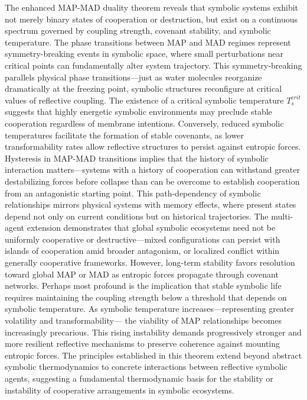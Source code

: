 \begin{scholium}
\label{scholium:bk5_Mutually Assured Continuous Progress}
The enhanced MAP-MAD duality theorem reveals that symbolic systems exhibit not merely binary states of cooperation or destruction, but exist on a continuous spectrum governed by coupling strength, covenant stability, and symbolic temperature. 
The phase transitions between MAP and MAD regimes represent symmetry-breaking events in symbolic space, where small perturbations near critical points can fundamentally alter system trajectory. This symmetry-breaking parallels physical phase transitions—just as water molecules reorganize dramatically at the freezing point, symbolic structures reconfigure at critical values of reflective coupling.
The existence of a critical symbolic temperature $T_s^{crit}$ suggests that highly energetic symbolic environments may preclude stable cooperation regardless of membrane intentions. Conversely, reduced symbolic temperatures facilitate the formation of stable covenants, as lower transformability rates allow reflective structures to persist against entropic forces.
Hysteresis in MAP-MAD transitions implies that the history of symbolic interaction matters—systems with a history of cooperation can withstand greater destabilizing forces before collapse than can be overcome to establish cooperation from an antagonistic starting point. This path-dependency of symbolic relationships mirrors physical systems with memory effects, where present states depend not only on current conditions but on historical trajectories.
The multi-agent extension demonstrates that global symbolic ecosystems need not be uniformly cooperative or destructive—mixed configurations can persist with islands of cooperation amid broader antagonism, or localized conflict within generally cooperative frameworks. However, long-term stability favors resolution toward global MAP or MAD as entropic forces propagate through covenant networks.
Perhaps most profound is the implication that stable symbolic life requires maintaining 
the coupling strength below a threshold that depends on symbolic temperature.
As symbolic temperature increases—representing greater volatility and transformability—
the viability of MAP relationships becomes increasingly precarious. 
This rising instability demands progressively stronger and more resilient reflective mechanisms 
to preserve coherence against mounting entropic forces.
The principles established in this theorem extend beyond abstract symbolic thermodynamics to concrete interactions between reflective symbolic agents, suggesting a fundamental thermodynamic basis for the stability or instability of cooperative arrangements in symbolic ecosystems.
\end{scholium}
